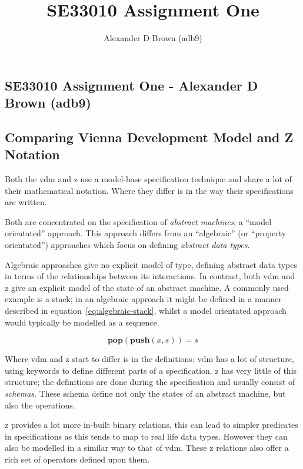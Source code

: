 \documentclass[a4paper, 10pt, notitlepage, fleqn]{article}
\title{SE33010 Assignment One}
\author{Alexander D Brown (adb9)}
\begin{document}
\begin{centering}
\section*{SE33010 Assignment One - Alexander D Brown (adb9)}
\subsection*{Comparing Vienna Development Model and Z Notation}
\end{centering}

Both the \gls{vdm} and \gls{z} use a model-base specification technique and share a lot of their 
mathematical notation. Where they differ is in the way their specifications are written.

Both are concentrated on the specification of \textit{abstract machines}; a ``model orientated'' 
approach. This approach differs from an ``algebraic'' (or ``property orientated'') approaches
which focus on defining \textit{abstract data types}\cite{Hayes93vdmz}.

Algebraic approaches give no explicit model of type, defining abstract data types in terms of the 
relationships between its interactions. In contrast, both \gls{vdm} and \gls{z} give an explicit 
model of the state of an abstract machine. A commonly used example is a stack; in an algebraic 
approach it might be defined in a manner described in equation~\ref{eq:algebraic-stack}, whilst
a model orientated approach would typically be modelled as a sequence.

\begin{equation}\label{eq:algebraic-stack}
\mathbf{pop}(\mathbf{push} (x,s)) = s
\end{equation}

Where \gls{vdm} and \gls{z} start to differ is in the definitions; \gls{vdm} has a lot of 
structure, using keywords to define different parts of a specification. \Gls{z} has very little of
this structure; the definitions are done during the specification and usually consist of
\textit{schemas}. These schema define not only the states of an abstract machine, but also the 
operations.

\Gls{z} provides a lot more in-built binary relations, this can lead to simpler predicates in
specifications as this tends to map to real life data types. However they can also be modelled in
a similar way to that of \gls{vdm}. These \gls{z} relations also offer a rich set of operators
defined upon them.
\end{document}

